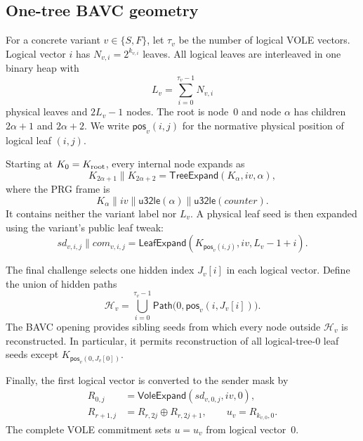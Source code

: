 \documentclass[11pt,a4paper]{article}
\newcommand{\xor}{\mathbin{\oplus}}
\newcommand{\TreeExpand}{\mathsf{TreeExpand}}
\newcommand{\LeafExpand}{\mathsf{LeafExpand}}
\newcommand{\VoleExpand}{\mathsf{VoleExpand}}
\newcommand{\pos}{\mathsf{pos}}
\newcommand{\Path}{\mathsf{Path}}
\begin{document}
\subsection{One-tree BAVC geometry}

For a concrete variant $v\in\{S,F\}$, let $\tau_v$ be the number of logical
VOLE vectors.  Logical vector $i$ has $N_{v,i}=2^{k_{v,i}}$ leaves.  All logical
leaves are interleaved in one binary heap with
\[
                  L_v=\sum_{i=0}^{\tau_v-1}N_{v,i}
\]
physical leaves and $2L_v-1$ nodes.  The root is node~0 and node $\alpha$ has
children $2\alpha+1$ and $2\alpha+2$.  We write $\pos_v(i,j)$ for the normative
physical position of logical leaf $(i,j)$.

Starting at $K_0=K_{\rm root}$, every internal node expands as
\begin{equation}
 K_{2\alpha+1}\mathbin\|K_{2\alpha+2}
   =\TreeExpand(K_\alpha,iv,\alpha),                    \label{eq:treeexpand}
\end{equation}
where the PRG frame is
\[
 K_\alpha\mathbin\|iv\mathbin\|\mathsf{u32le}(\alpha)
          \mathbin\|\mathsf{u32le}(\mathit{counter}).
\]
It contains neither the variant label nor $L_v$.  A physical leaf seed is then
expanded using the variant's public leaf tweak:
\begin{equation}
 sd_{v,i,j}\mathbin\|com_{v,i,j}
 =\LeafExpand(K_{\pos_v(i,j)},iv,L_v-1+i).              \label{eq:leafexpand}
\end{equation}

The final challenge selects one hidden index $J_v[i]$ in each logical vector.
Define the union of hidden paths
\begin{equation}
 \mathcal H_v=\bigcup_{i=0}^{\tau_v-1}
   \Path\bigl(0,\pos_v(i,J_v[i])\bigr).                 \label{eq:hiddenpaths}
\end{equation}
The BAVC opening provides sibling seeds from which every node outside
$\mathcal H_v$ is reconstructed.  In particular, it permits reconstruction of all
logical-tree-0 leaf seeds except $K_{\pos_v(0,J_v[0])}$.

Finally, the first logical vector is converted to the sender mask by
\begin{align}
 R_{0,j}&=\VoleExpand(sd_{v,0,j},iv,0),\nonumber\\
 R_{r+1,j}&=R_{r,2j}\xor R_{r,2j+1},\qquad
 u_v=R_{k_{v,0},0}.                                    \label{eq:volefold}
\end{align}
The complete VOLE commitment sets $u=u_v$ from logical vector~0.
\end{document}
